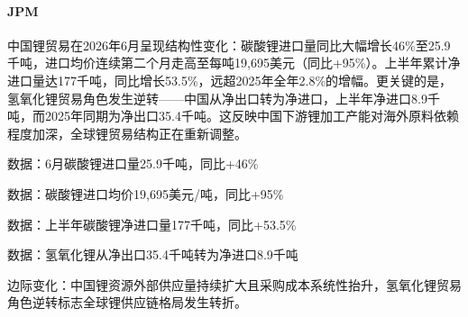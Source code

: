 \documentclass[11pt]{ctexart}
\begin{document}
\paragraph{JPM} 中国锂贸易在2026年6月呈现结构性变化：碳酸锂进口量同比大幅增长46\%至25.9千吨，进口均价连续第二个月走高至每吨19,695美元（同比+95\%）。上半年累计净进口量达177千吨，同比增长53.5\%，远超2025年全年2.8\%的增幅。更关键的是，氢氧化锂贸易角色发生逆转——中国从净出口转为净进口，上半年净进口8.9千吨，而2025年同期为净出口35.4千吨。这反映中国下游锂加工产能对海外原料依赖程度加深，全球锂贸易结构正在重新调整。
{\small\color{refgray}数据：6月碳酸锂进口量25.9千吨，同比+46\%\par}
{\small\color{refgray}数据：碳酸锂进口均价19,695美元/吨，同比+95\%\par}
{\small\color{refgray}数据：上半年碳酸锂净进口量177千吨，同比+53.5\%\par}
{\small\color{refgray}数据：氢氧化锂从净出口35.4千吨转为净进口8.9千吨\par}
{\small\color{refgray}边际变化：中国锂资源外部供应量持续扩大且采购成本系统性抬升，氢氧化锂贸易角色逆转标志全球锂供应链格局发生转折。\par}
\end{document}
